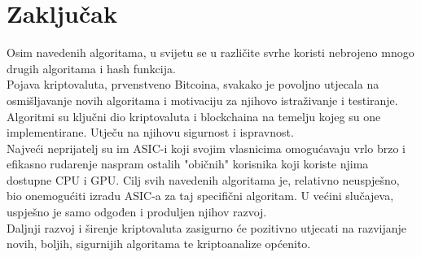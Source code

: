 \documentclass[12pt]{article}
\providecommand\phantomsection{}
\begin{document}
\section{Zaključak}
Osim navedenih algoritama, u svijetu se u različite svrhe koristi nebrojeno mnogo drugih algoritama i hash funkcija.\\
Pojava kriptovaluta, prvenstveno Bitcoina, svakako je povoljno utjecala na osmišljavanje novih algoritama i motivaciju za njihovo istraživanje i testiranje. \\
Algoritmi su ključni dio kriptovaluta i blockchaina na temelju kojeg su one implementirane. Utječu na njihovu sigurnost i ispravnost.\\
Najveći neprijatelj su im ASIC-i koji svojim vlasnicima omogućavaju vrlo brzo i efikasno rudarenje naspram ostalih "običnih" korisnika koji koriste njima dostupne CPU i GPU. Cilj svih navedenih algoritama je, relativno neuspješno, bio onemogućiti izradu ASIC-a za taj specifični algoritam. U većini slučajeva, uspješno je samo odgođen i produljen njihov razvoj.\\
Daljnji razvoj i širenje kriptovaluta zasigurno će pozitivno utjecati na razvijanje novih, boljih, sigurnijih algoritama te kriptoanalize općenito.


\pagebreak


\phantomsection
{}




	
\end{document}
